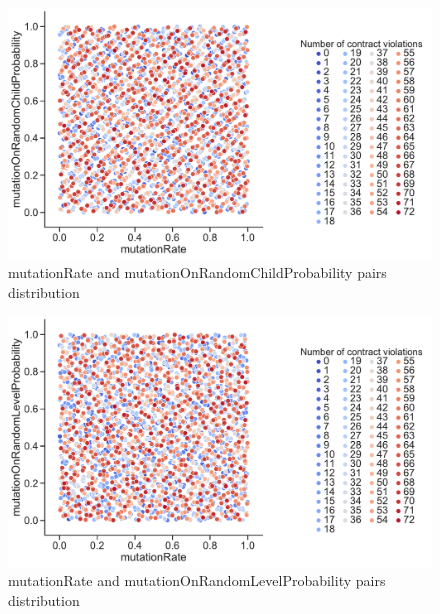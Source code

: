 \begin{figure}
	\centering
	\includegraphics[width=\textwidth]{images/PairsDistr/mutationRate_mutationOnRandomChildProbability.pdf}
	\caption[mutationRate and mutationOnRandomChildProbability pairs distribution]{mutationRate and mutationOnRandomChildProbability pairs distribution}
	\label{fig:mutationRate_mutationOnRandomChildProbability_pair}
\end{figure}
\clearpage
\begin{figure}
	\centering
	\includegraphics[width=\textwidth]{images/PairsDistr/mutationRate_mutationOnRandomLevelProbability.pdf}
	\caption[mutationRate and mutationOnRandomLevelProbability pairs distribution]{mutationRate and mutationOnRandomLevelProbability pairs distribution}
	\label{fig:mutationRate_mutationOnRandomLevelProbability_pair}
\end{figure}
\clearpage
